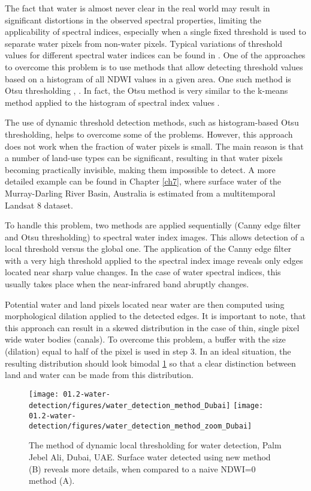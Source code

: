 The fact that water is almost never clear in the real world may result in significant distortions in the observed spectral properties, limiting the applicability of spectral indices, especially when a single fixed threshold is used to separate water pixels from non-water pixels. Typical variations of threshold values for different spectral water indices can be found in \citet{Ji2009}. One of the approaches to overcome this problem is to use methods that allow detecting threshold values based on a histogram of all \gls{NDWI} values in a given area. One such method is Otsu thresholding \citet{Li2013}, \citet{Yang2014}. In fact, the Otsu method is very similar to the k-means method applied to the histogram of spectral index values \citet{Liu2009}.

The use of dynamic threshold detection methods, such as histogram-based Otsu thresholding, helps to overcome some of the problems. However, this approach does not work when the fraction of water pixels is small. The main reason is that a number of land-use types can be significant, resulting in that water pixels becoming practically invisible, making them impossible to detect. A more detailed example can be found in Chapter \ref{ch7}, where surface water of the Murray-Darling River Basin, Australia is estimated from a multitemporal Landsat 8 dataset.

To handle this problem, two methods are applied sequentially (Canny edge filter and Otsu thresholding) to spectral water index images. This allows detection of a local threshold versus the global one. The application of the Canny edge filter with a very high threshold applied to the spectral index image reveals only edges located near sharp value changes. In the case of water spectral indices, this usually takes place when the near-infrared band abruptly changes.

Potential water and land pixels located near water are then computed using morphological dilation applied to the detected edges. It is important to note, that this approach can result in a skewed distribution in the case of thin, single pixel wide water bodies (canals). To overcome this problem, a buffer with the size (dilation) equal to half of the pixel is used in step 3. In an ideal situation, the resulting distribution should look bimodal \ref{fig:water_detection_method} so that a clear distinction between land and water can be made from this distribution.

\begin{figure}
	\centering
	\texttt{[image: 01.2-water-detection/figures/water\_detection\_method\_Dubai]}
	\texttt{[image: 01.2-water-detection/figures/water\_detection\_method\_zoom\_Dubai]}
	\caption{The method of dynamic local thresholding for water detection, Palm Jebel Ali, Dubai, UAE. Surface water detected using new method (B) reveals more details, when compared to a naive NDWI=0 method (A). }
	\label{fig:water_detection_method}
\end{figure}

